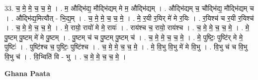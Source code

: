 \documentclass[17pt]{extarticle}
\begin{document}
33. च॒ मे॒ मे॒ च॒ च॒ मे॒ । . म॒ औद्भि॑द्य॒ मौद्भि॑द्यम् मे म॒ औद्भि॑द्यम् । . औद्भि॑द्यम् च॒ चौद्भि॑द्य॒ मौद्भि॑द्यम् च । . औद्भि॑द्य॒मित्यौत् - भि॒द्य॒म् । . च॒ मे॒ मे॒ च॒ च॒ मे॒ । . मे॒ र॒यी र॒यिर् मे॑ मे र॒यिः । . र॒यिश्च॑ च र॒यी र॒यिश्च॑ । . च॒ मे॒ मे॒ च॒ च॒ मे॒ । . मे॒ रायो॒ रायो॑ मे मे॒ रायः॑ । . राय॑श्च च॒ रायो॒ राय॑श्च । . च॒ मे॒ मे॒ च॒ च॒ मे॒ । . मे॒ पु॒ष्टम् पु॒ष्टम् मे॑ मे पु॒ष्टम् । . पु॒ष्टम् च॑ च पु॒ष्टम् पु॒ष्टम् च॑ । . च॒ मे॒ मे॒ च॒ च॒ मे॒ । . मे॒ पुष्टिः॒ पुष्टि॑र् मे मे॒ पुष्टिः॑ । . पुष्टि॑श्च च॒ पुष्टिः॒ पुष्टि॑श्च । . च॒ मे॒ मे॒ च॒ च॒ मे॒ । . मे॒ वि॒भु वि॒भु मे॑ मे वि॒भु । . वि॒भु च॑ च वि॒भु वि॒भु च॑ । . वि॒भ्विति॑ वि - भु । . च॒ मे॒ मे॒ च॒ च॒ मे॒ । \newline

\textbf{Ghana Paata } \newline
\end{document}

